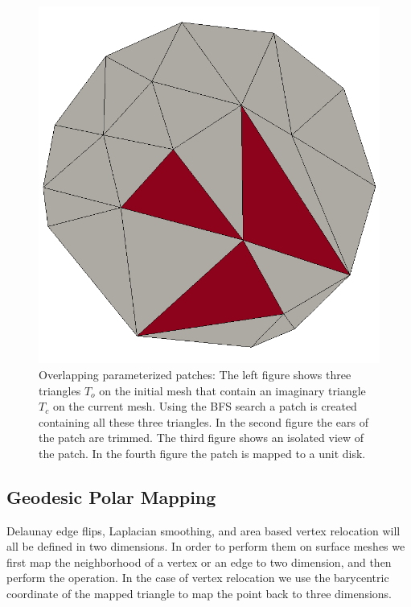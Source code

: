 \documentclass[letter,11pt]{article}
\begin{document}
\begin{figure}
\begin{minipage}{.2\textwidth}
  \end{minipage} 
  \begin{minipage}{0.2\textwidth}
    \centering
    \includegraphics[width=1\linewidth]{../image/patch3.png}
  \end{minipage}
  \caption{Overlapping parameterized patches: The left figure shows
    three triangles $T_o$ on the initial mesh that contain an
    imaginary triangle $T_c$ on the current mesh. Using the BFS search
    a patch is created containing all these three triangles. In the
    second figure the ears of the patch are trimmed. The third figure
    shows an isolated view of the patch. In the fourth figure the
    patch is mapped to a unit disk.}
  \label{fig:patch}
\end{figure}

\subsection*{Geodesic Polar Mapping}

Delaunay edge flips, Laplacian smoothing, and area based vertex
relocation will all be defined in two dimensions. In order to perform
them on surface meshes we first map the neighborhood of a vertex or
an edge to two dimension, and then perform the operation. In the case
of vertex relocation we use the barycentric coordinate of the mapped
triangle to map the point back to three dimensions.
\end{document}
